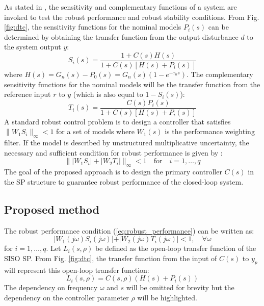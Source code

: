 \documentclass[default]{svmult}
\begin{document}
As stated in \cite{DFT92}, the sensitivity and complementary functions of a system are invoked to test the robust performance and robust stability conditions. From Fig. \ref{fig:dtc}, the sensitivity functions for the nominal models $P_i(s)$ can be determined by obtaining the transfer function from the output disturbance $d$ to the system output $y$:
\begin{equation}\label{eq:sensitivity}
S_i(s)=\frac{1+C(s)H(s)}{1+C(s)[H(s)+P_i(s)]}
\end{equation}
where $H(s)=G_n(s)-P_0(s)=G_n(s)(1-e^{-\tau_n s})$. The complementary sensitivity functions for the nominal models will be the transfer function from the reference input $r$ to $y$ (which is also equal to $1-S_i(s)$):
\begin{equation}\label{eq:sensitivity_comple}
T_i(s)=\frac{C(s)P_i(s)}{1+C(s)[H(s)+P_i(s)]}
\end{equation}
A standard robust control problem is to design a controller that satisfies $\| W_1S_i\|_{\infty}<1$ for a set of models where $W_1(s)$ is the performance weighting filter. If the model is described by unstructured multiplicative uncertainty, the necessary and sufficient condition for robust performance is given by \cite{DFT92}:
\begin{equation}\label{eq:robust_performance}
\|  |W_1S_i| + |W_2T_i| \|_{\infty}<1  \quad \mbox{for} \quad i=1,\ldots, q
\end{equation}
The goal of the proposed approach is to design the primary controller $C(s)$ in the SP structure to guarantee robust performance of the closed-loop system. 

\subsection{Proposed method} \label{sec:siso_pro}

The robust performance condition (\ref{eq:robust_performance}) can be written as: 
\begin{equation}\label{eq:robust_performance2}
\left| W_{1}(j\omega)S_i(j\omega)| + |W_{2}(j\omega)T_i(j\omega) \right|<1,\quad \forall \omega
\end{equation}
for $i=1,\ldots, q$. Let $L_i(s,\rho)$ be defined as the open-loop transfer function of the SISO SP. From Fig. \ref{fig:dtc}, the transfer function from the input of $C(s)$ to $y_p$ will represent this open-loop transfer function:
\begin{equation}
L_i(s,\rho)=C(s,\rho)(H(s)+P_i(s))
\end{equation} 
The dependency on frequency $\omega$ and $s$ will be omitted for brevity but the dependency on the controller parameter $\rho$ will be highlighted. 
\end{document}
